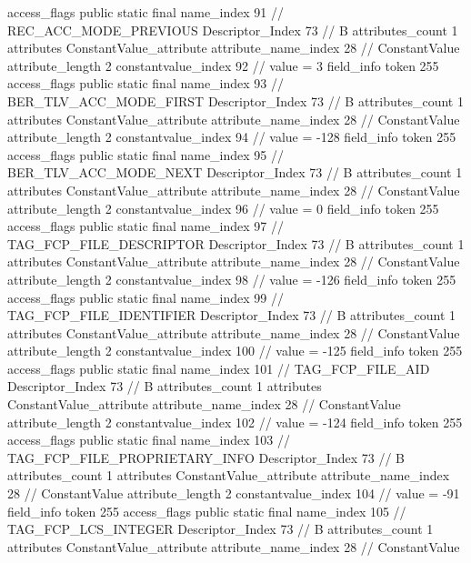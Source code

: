 {{{{{				access_flags	public static final
				name_index	91		// REC_ACC_MODE_PREVIOUS
				Descriptor_Index	73		// B
				attributes_count	1
				attributes {
				ConstantValue_attribute {
					attribute_name_index	28		// ConstantValue
					attribute_length	2
					constantvalue_index	92		// value = 3
				}
				}
			}
			field_info {
				token	255
				access_flags	public static final
				name_index	93		// BER_TLV_ACC_MODE_FIRST
				Descriptor_Index	73		// B
				attributes_count	1
				attributes {
				ConstantValue_attribute {
					attribute_name_index	28		// ConstantValue
					attribute_length	2
					constantvalue_index	94		// value = -128
				}
				}
			}
			field_info {
				token	255
				access_flags	public static final
				name_index	95		// BER_TLV_ACC_MODE_NEXT
				Descriptor_Index	73		// B
				attributes_count	1
				attributes {
				ConstantValue_attribute {
					attribute_name_index	28		// ConstantValue
					attribute_length	2
					constantvalue_index	96		// value = 0
				}
				}
			}
			field_info {
				token	255
				access_flags	public static final
				name_index	97		// TAG_FCP_FILE_DESCRIPTOR
				Descriptor_Index	73		// B
				attributes_count	1
				attributes {
				ConstantValue_attribute {
					attribute_name_index	28		// ConstantValue
					attribute_length	2
					constantvalue_index	98		// value = -126
				}
				}
			}
			field_info {
				token	255
				access_flags	public static final
				name_index	99		// TAG_FCP_FILE_IDENTIFIER
				Descriptor_Index	73		// B
				attributes_count	1
				attributes {
				ConstantValue_attribute {
					attribute_name_index	28		// ConstantValue
					attribute_length	2
					constantvalue_index	100		// value = -125
				}
				}
			}
			field_info {
				token	255
				access_flags	public static final
				name_index	101		// TAG_FCP_FILE_AID
				Descriptor_Index	73		// B
				attributes_count	1
				attributes {
				ConstantValue_attribute {
					attribute_name_index	28		// ConstantValue
					attribute_length	2
					constantvalue_index	102		// value = -124
				}
				}
			}
			field_info {
				token	255
				access_flags	public static final
				name_index	103		// TAG_FCP_FILE_PROPRIETARY_INFO
				Descriptor_Index	73		// B
				attributes_count	1
				attributes {
				ConstantValue_attribute {
					attribute_name_index	28		// ConstantValue
					attribute_length	2
					constantvalue_index	104		// value = -91
				}
				}
			}
			field_info {
				token	255
				access_flags	public static final
				name_index	105		// TAG_FCP_LCS_INTEGER
				Descriptor_Index	73		// B
				attributes_count	1
				attributes {
				ConstantValue_attribute {
					attribute_name_index	28		// ConstantValue
}}}}}}}
